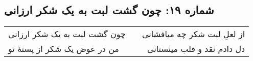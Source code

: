\begin{center}
\section*{شماره ۱۹: چون گشت لبت به یک شکر ارزانی}
\label{sec:019}
\begin{longtable}{l p{0.5cm} r}
چون گشت لبت به یک شکر ارزانی
&&
از لعلِ لبت شکر چه میافشانی
\\
من در عوض یک شکر از پستهٔ تو
&&
دل دادم نقد و قلب مینستانی
\\
\end{longtable}
\end{center}
